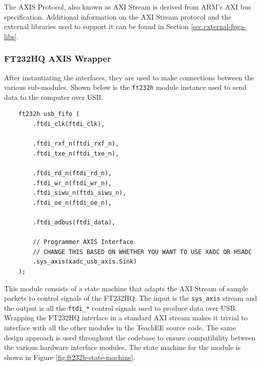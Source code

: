 \documentclass[letterpaper,11pt]{article}
\newcommand{\code}[1]{\texttt{#1}}
\begin{document}
The AXIS Protocol, also known as AXI Stream is derived from ARM's AXI bus
specification. Additional information on the AXI Stream protocol and the
external libraries used to support it can be found in Section
\ref{sec:external-fpga-libs}.

\subsubsection{FT232HQ AXIS Wrapper}
After instantiating the interfaces, they are used to make connections between
the various sub-modules. Shown below is the \code{ft232h} module instance used
to send data to the computer over USB.

\begin{verbatim}
    ft232h usb_fifo (
        .ftdi_clk(ftdi_clk),

        .ftdi_rxf_n(ftdi_rxf_n),
        .ftdi_txe_n(ftdi_txe_n),

        .ftdi_rd_n(ftdi_rd_n),
        .ftdi_wr_n(ftdi_wr_n),
        .ftdi_siwu_n(ftdi_siwu_n),
        .ftdi_oe_n(ftdi_oe_n),

        .ftdi_adbus(ftdi_data),

        // Programmer AXIS Interface
        // CHANGE THIS BASED ON WHETHER YOU WANT TO USE XADC OR HSADC
        .sys_axis(xadc_usb_axis.Sink)
    );
\end{verbatim}

This module consists of a state machine that adapts the AXI Stream of sample
packets to control signals of the FT232HQ. The input is the \code{sys_axis}
stream and the output is all the \code{ftdi_*} control signals used to produce
data over USB. Wrapping the FT232HQ interface in a standard AXI stream makes it
trivial to interface with all the other modules in the TeachEE source code. The
same design approach is used throughout the codebase to ensure compatibility
between the various hardware interface modules. The state machine for the module
is shown in Figure \ref{fig:ft232h-state-machine}.
\end{document}
